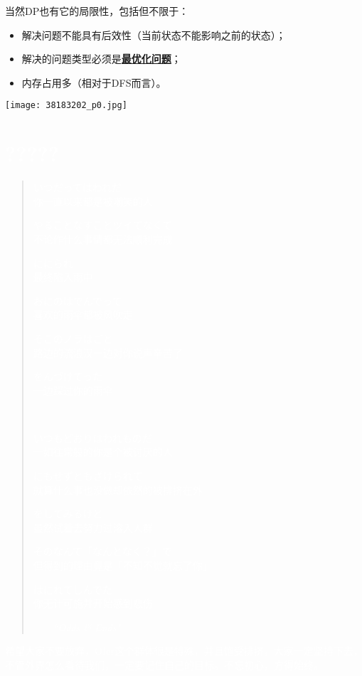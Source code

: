 当然DP也有它的局限性，包括但不限于：
\begin{itemize}
	\item{解决问题不能具有后效性（当前状态不能影响之前的状态）；}
	\item{解决的问题类型必须是\textbf{\underline{最优化问题}}；}
	\item{内存占用多（相对于DFS而言）。}
\end{itemize}

\begin{center}\texttt{[image: 38183202\_p0.jpg]}\end{center}
\note

\section*{\textcolor{white}{?????}}
\begin{quote}

	\textcolor{white}{いつだってはわれだ\\
		你一直以来都是被嘲笑的人}

	\textcolor{white}{やることなすことツイてなくて\\
		不论作什么事情都无法顺利完成}

	\textcolor{white}{ににられ\\
		最终陷入雨中}

	\textcolor{white}{おにのはでんでって\\
		喜欢的雨伞都被风吹走}

	\textcolor{white}{そこのノラはごと\\
		路边的流浪汉一边对你说声辛苦了}

	\textcolor{white}{をんづけてった\\
		一边踩过你的雨伞}

	\ \par

	\textcolor{white}{いつもどおりはわれものだ\\
		一如往常般的你是个被讨厌的人}

	\textcolor{white}{にもせずともざけられて\\
		就算什么事也没做却依然的被排挤在外}

	\textcolor{white}{をしてみるけど\\
		虽然试着去努力过溶入人群}

	\textcolor{white}{そのなんて「なんとなく？」で\\
		但得到的理由竟是「不知不觉就忘了你」}

	\textcolor{white}{はにれてしんでた\\
		你无计可施并开始感到悲伤}
	\begin{flushright}\textcolor{white}{------}\em{\textcolor{white}{``Odds \& Ends"}}\end{flushright}
\end{quote}

\textcolor{white}{希望大家不要放弃，OIer这个群体很是特殊，并且饱受排挤，大家一定坚持下去，不管外界怎么看待我们，一定要记住自己的目标。不忘初心，方得始终。}
\newpage